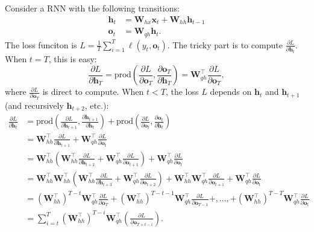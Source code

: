 Consider a RNN with the following transitions:
    \begin{equation}
        \begin{aligned}
            \bm{h}_t & = \bm{W}_{hx} \bm{x}_t + \bm{W}_{hh} \bm{h}_{t-1} \\
            \bm{o}_t & = \bm{W}_{qh} \bm{h}_t.
        \end{aligned}
    \end{equation}
The loss funciton is $L=\frac{1}{T}\sum_{i=1}^{T}{\ell(y_t, \bm{o}_t)}$.
The tricky part is to compute $\frac{\partial L}{\partial \bm{h}_t}$.
When $t=T$, this is easy:
    \begin{equation}
        \frac{\partial L}{\partial \bm{h}_T} = \text{prod}\left( \frac{\partial L}{\partial \bm{o}_T}, \frac{\partial \bm{o}_T}{\partial \bm{h}_T}  \right) = \bm{W}_{qh}^\top \frac{\partial L}{\partial \bm{o}_T},
    \end{equation}
where $\frac{\partial L}{\partial \bm{o}_T}$ is direct to compute. 
When $t < T$, the loss $L$ depends on $\bm{h}_t$ and $\bm{h}_{t+1}$ (and recursively $\bm{h}_{t+2}$, etc.):
    \begin{equation}\label{rnn-grad}
        \begin{aligned}
            \frac{\partial L}{\partial \bm{h}_t} & = \text{prod}\left( \frac{\partial L}{\partial \bm{h}_{t+1}}, \frac{\partial \bm{h}_{t+1}}{\partial  \bm{h}_{t}} \right) + \text{prod}\left( \frac{\partial L}{\partial \bm{o}_t} , \frac{\partial \bm{o}_t}{\partial \bm{h}_t} \right) \\
            & = \bm{W}_{hh}^\top \frac{\partial L}{\partial \bm{h}_{t+1}} + \bm{W}_{qh}^\top \frac{\partial L}{\partial \bm{o}_t} \\
            & = \bm{W}_{hh}^\top\left( \bm{W}_{hh}^\top \frac{\partial L}{\partial \bm{h}_{t+2}} +  \bm{W}_{qh}^\top \frac{\partial L}{\partial \bm{o}_{t+1}} \right) + \bm{W}_{qh}^\top \frac{\partial L}{\partial \bm{o}_t} \\
            & = \bm{W}_{hh}^\top \bm{W}_{hh}^\top \left( \bm{W}_{hh}^\top \frac{\partial L}{\partial \bm{h}_{t+3}} +  \bm{W}_{qh}^\top \frac{\partial L}{\partial \bm{o}_{t+2}}\right) + \bm{W}_{hh}^\top \bm{W}_{qh}^\top \frac{\partial L}{\partial \bm{o}_{t+1}}  + \bm{W}_{qh}^\top \frac{\partial L}{\partial \bm{o}_t} \\
            & = \left( \bm{W}_{hh}^\top \right)^{T-t} \bm{W}_{qh}^\top \frac{\partial L}{\partial \bm{o}_T} + \left( \bm{W}_{hh}^\top \right)^{T-t-1}\bm{W}_{qh}^\top \frac{\partial L}{\partial \bm{o}_{T-1}} +, \ldots, + \left( \bm{W}_{hh}^\top \right)^{T-T} \bm{W}_{qh}^\top \frac{\partial L}{\partial \bm{o}_t} \\
            & = \sum_{i=t}^{T}{\left( \bm{W}_{hh}^\top \right)^{T-i} \bm{W}_{qh}^\top  } \left( \frac{\partial L}{\partial \bm{o}_{T+t-i} } \right).
        \end{aligned}
    \end{equation}
